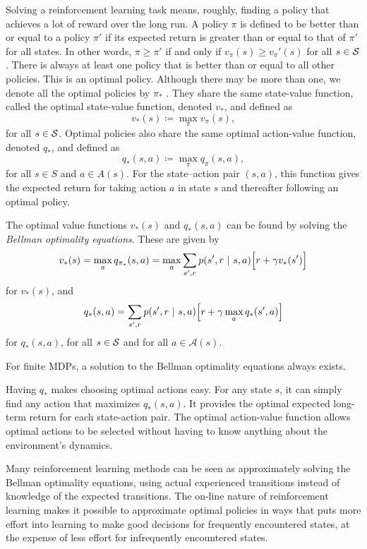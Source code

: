 Solving a reinforcement learning task means, roughly, finding a policy that achieves a lot of reward over the long run.
A policy $\pi$ is defined to be better than or equal to a policy $\pi'$ if its expected return is greater than or equal to that of $\pi'$ for all states. In other words, $\pi \geq \pi'$ if and only if $v_\pi(s) \geq v_\pi'(s)$ for all $s \in \S$. There is always at least one policy that is better than or equal to all other policies. This is an optimal policy. Although there may be more than one, we denote all the optimal policies by $\pi_*$ . They share the same state-value function, called the optimal state-value function, denoted $v_*$, and defined as
\begin{equation}
    v_*(s) \coloneqq \max\limits_{\pi}v_\pi(s),
\end{equation}
for all $s \in \S$.
Optimal policies also share the same optimal action-value function, denoted $q_* $, and defined as
\begin{equation}
    q_*(s, a) \coloneqq \max\limits_{\pi} q_\pi(s, a),
\end{equation}
for all $s \in S$ and $a \in A(s)$. For the state–action pair $(s, a)$, this function gives the expected return for taking action $a$ in state $s$ and thereafter following an optimal policy.

The optimal value functions $v_*(s)$ and $q_*(s,a)$ can be found by solving the \textit{Bellman optimality equations}. These are given by
\begin{equation}
    v_*(s) = \max\limits_a q_{\pi_*}(s,a) = \max\limits_a \sum_{s', r} p(s', r \cbar s, a) \Bigr[r + \gamma v_*(s')\Bigr]
\end{equation}
for $v_*(s)$, and
\begin{equation}
    q_*(s, a) = \sum_{s', r} p(s', r \cbar s, a) \Bigr[r + \gamma \max\limits_a q_*(s', a)\Bigr]
\end{equation}
for $q_*(s, a)$, for all $s \in \S$ and for all $a \in \mathcal{A}(s)$.

For finite MDPs, a solution to the Bellman optimality equations always exists.

Having $q_*$ makes choosing optimal actions easy. For any state $s$, it can simply find any action that maximizes $q_*(s, a)$. It provides the optimal expected long-term return for each state-action pair. The optimal action-value function allows optimal actions to be selected without having to know anything about the environment’s dynamics.

Many reinforcement learning methods can be seen as approximately solving the Bellman optimality equations, using actual experienced transitions instead of knowledge of the expected transitions. The on-line nature of reinforcement learning makes it possible to approximate optimal policies in ways that puts more effort into learning to make good decisions for frequently encountered states, at the expense of less effort for infrequently encountered states.
